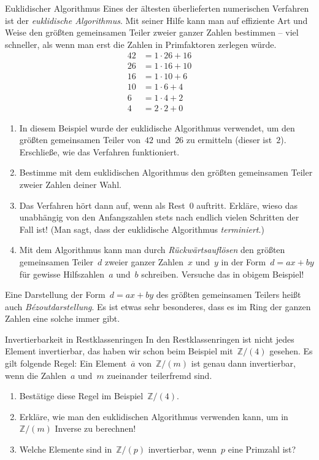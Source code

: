 \documentclass{../zirkelblatt}
\newcommand{\ol}[1]{\ensuremath{\overline{#1}}}
\newcommand{\ZZ}{\mathbb{Z}}
\begin{document}
\newpage
\begin{aufgabe}{Euklidischer Algorithmus}
Eines der ältesten überlieferten numerischen Verfahren ist der
\emph{euklidische Algorithmus}. Mit seiner Hilfe kann man auf effiziente Art und Weise
den größten gemeinsamen Teiler zweier ganzer Zahlen bestimmen -- viel
schneller, als wenn man erst die Zahlen in Primfaktoren zerlegen würde.
\begin{align*}
    42 &= 1 \cdot 26 + 16 \\
    26 &= 1 \cdot 16 + 10 \\
    16 &= 1 \cdot 10 + 6 \\
    10 &= 1 \cdot 6 + 4 \\
    6 &= 1 \cdot 4 + 2 \\
    4 &= 2 \cdot 2 + 0
\end{align*}
\begin{enumerate}
\item In diesem Beispiel wurde der euklidische Algorithmus verwendet, um den
größten gemeinsamen Teiler von~$42$ und~$26$ zu ermitteln (dieser ist~$2$).
Erschließe, wie das Verfahren funktioniert.
\item Bestimme mit dem euklidischen Algorithmus den größten gemeinsamen Teiler
zweier Zahlen deiner Wahl.
\item Das Verfahren hört dann auf, wenn als Rest~$0$ auftritt. Erkläre, wieso
das unabhängig von den Anfangszahlen stets nach endlich vielen Schritten der
Fall ist! (Man sagt, dass der euklidische Algorithmus \emph{terminiert}.)
\item Mit dem Algorithmus kann man durch \emph{Rückwärtsauflösen} den größten
gemeinsamen Teiler~$d$ zweier ganzer Zahlen~$x$ und~$y$ in der Form~$d = ax +
by$ für gewisse Hilfszahlen~$a$ und~$b$ schreiben. Versuche das in obigem
Beispiel!
\end{enumerate}
Eine Darstellung der Form~$d = ax + by$ des größten gemeinsamen Teilers heißt
auch \emph{Bézoutdarstellung}. Es ist etwas sehr besonderes, dass es im Ring
der ganzen Zahlen eine solche immer gibt.
\end{aufgabe}

\begin{aufgabe}{Invertierbarkeit in Restklassenringen}
In den Restklassenringen ist nicht jedes Element invertierbar, das haben wir
schon beim Beispiel mit~$\ZZ/(4)$ gesehen. Es gilt folgende Regel: Ein
Element~$\ol{a}$ von~$\ZZ/(m)$ ist genau dann invertierbar, wenn die Zahlen~$a$
und~$m$ zueinander teilerfremd sind.
\begin{enumerate}
\item Bestätige diese Regel im Beispiel~$\ZZ/(4)$.
\item Erkläre, wie man den euklidischen Algorithmus verwenden kann, um
in~$\ZZ/(m)$ Inverse zu berechnen!
\item Welche Elemente sind in~$\ZZ/(p)$ invertierbar, wenn~$p$ eine Primzahl
ist?
\end{enumerate}
\end{aufgabe}
\end{document}
